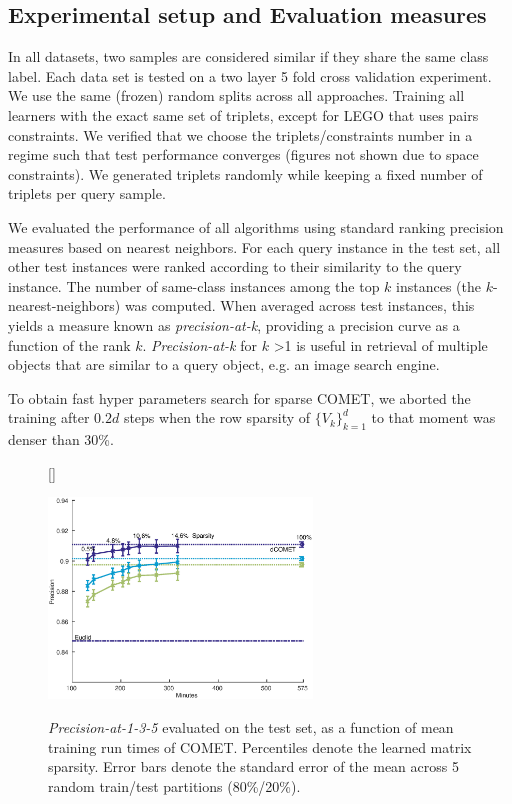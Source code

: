 \documentclass[twoside,11pt]{article}
\newcommand\mat[1]{{#1}}
\newcommand{\Vk}{\mat{V_k}}
\newcommand{\Vgrc}{\{\Vk\}_{k=1}^{d}} %
\begin{document}
\subsection{Experimental setup and Evaluation measures}
In all datasets, two samples are considered similar if they share the same class label. Each data set is tested on a two layer 5 fold cross validation experiment. We use the same (frozen) random splits across all approaches. Training all learners with the exact same set of triplets, except for LEGO that uses pairs constraints. We verified that we choose the triplets/constraints number in a regime such that test performance converges (figures not shown due to space constraints). We generated triplets randomly while keeping a fixed number of triplets per query sample.

We evaluated the performance of all algorithms using standard ranking precision measures based on nearest neighbors. For each query instance in the test set, all other test instances were ranked according to their similarity to the query instance. The number of same-class instances
among the top $k$ instances (the $k$-nearest-neighbors) was computed. When averaged across test
instances, this yields a measure known as \textit{precision-at-k},
providing a precision curve as a function of the rank $k$. \textit{Precision-at-k} for $k$ >1 is useful in retrieval of multiple objects that are similar to a query object, e.g. an image search engine.

To obtain fast hyper parameters search for sparse COMET, we aborted the training after $0.2 d$ steps when the row sparsity of $\Vgrc$ to that moment was denser than 30\%. 


\begin{figure}
\captionsetup{font=small}
[\FBwidth]
{\caption{\textit{Precision-at-1-3-5} evaluated on the test set, as a function of mean training run times of COMET. Percentiles denote the learned matrix sparsity. Error bars denote the standard error of the mean across 5 random train/test partitions (80\%/20\%).}\label{spCometPrecTime}}
{\includegraphics[width=7cm]{sCOMET_precision_vs_runtime}}
\end{figure}
\end{document}
